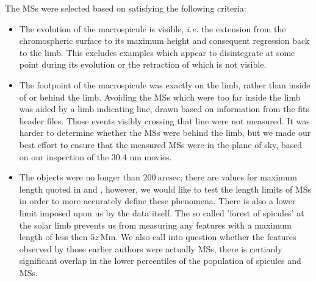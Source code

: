 The MSs were selected based on satisfying the following criteria: 
\begin{itemize}
	\item{ The evolution of the macrospicule is visible, \emph{i.e.} the extension from the chromospheric surface to its maximum height and consequent regression back to the limb. This excludes examples which appear to disintegrate at some point during its evolution or the retraction of which is not visible.}
	\item{The footpoint of the macrospicule was exactly on the limb, rather than inside of or behind the limb. Avoiding the MSs which were too far inside the limb was aided by a limb indicating line, drawn based on information from the fits header files. Those events visibly crossing that line were not measured. It was harder to determine whether the MSs were behind the limb, but we made our best effort to ensure that the measured MSs were in the plane of sky, based on our inspection of the $30.4$ nm movies.}
	\item{The objects were no longer than $200\ \textrm{arcsec}$; there are values for maximum length quoted in \cite{Bohlin1975} and \cite{Dere89}, however, we would like to test the length limits of MSs in order to more accurately define these phenomena. There is also a lower limit imposed upon us by the data itself. The so called 'forest of spicules' at the solar limb prevents us from measuring any features with a maximum length of less then $5z\ \textrm{Mm}$. We also call into question whether the features observed by those earlier authors were actually MSs, there is certianly significant overlap in the lower percentiles of the population of spicules and MSs.}
\end{itemize}



